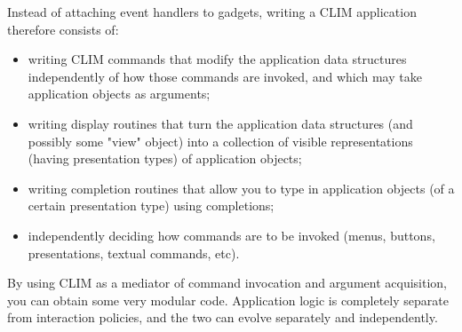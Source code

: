 Instead of attaching event handlers to gadgets, writing a CLIM
application therefore consists of:

\begin{itemize}
\item
 writing CLIM commands that modify the application data structures
  independently of how those commands are invoked, and which may take
  application objects as arguments;
\item
 writing display routines that turn the application data structures (and
  possibly some "view" object) into a collection of visible
  representations (having presentation types) of application objects;
\item
 writing completion routines that allow you to type in application
  objects (of a certain presentation type) using completions;
\item
 independently deciding how commands are to be invoked (menus, buttons,
  presentations, textual commands, etc).
\end{itemize}

By using CLIM as a mediator of command invocation and argument
acquisition, you can obtain some very modular code.  Application logic
is completely separate from interaction policies, and the two can evolve
separately and independently.
